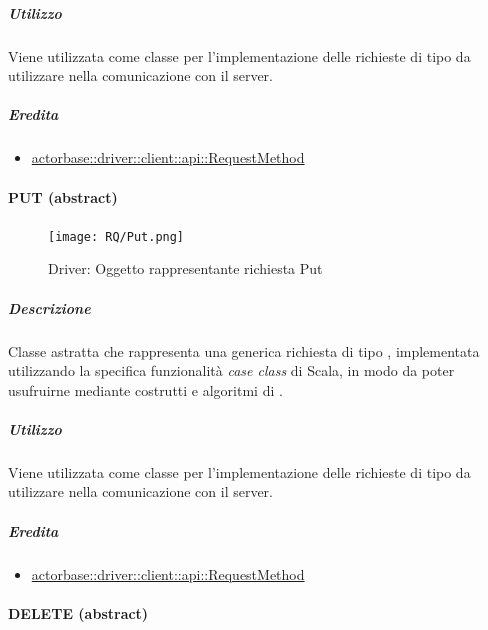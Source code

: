 \documentclass{scalatekids-article}
\begin{document}
\subparagraph{Utilizzo}

Viene utilizzata come classe per l'implementazione delle richieste 
di tipo  da utilizzare nella comunicazione con il server.

\subparagraph{Eredita}

\begin{itemize}
\item \hyperref[sec:actorbase::driver::client::api::RequestMethod]{actorbase::driver::client::api::RequestMethod}
\end{itemize}


\paragraph{PUT (abstract)}
\label{sec:actorbase::driver::client::api::PUT}

\begin{figure}[H]
  \begin{center}
    \texttt{[image: RQ/Put.png]}
    \caption{Driver: Oggetto rappresentante richiesta Put}
  \end{center}
\end{figure}

\subparagraph{Descrizione}

Classe astratta che rappresenta una generica richiesta  di tipo
, implementata utilizzando la specifica funzionalità \textit{case
  class} di Scala, in modo da poter usufruirne mediante costrutti e algoritmi di
.

\subparagraph{Utilizzo}

Viene utilizzata come classe per l'implementazione delle richieste 
di tipo  da utilizzare nella comunicazione con il server.

\subparagraph{Eredita}

\begin{itemize}
\item \hyperref[sec:actorbase::driver::client::api::RequestMethod]{actorbase::driver::client::api::RequestMethod}
\end{itemize}


\paragraph{DELETE (abstract)}
\label{sec:actorbase::driver::client::api::DELETE}
\end{document}
